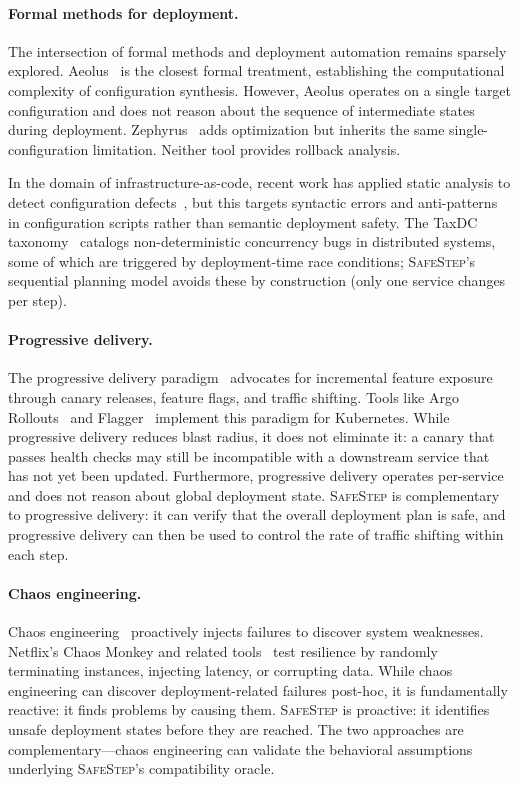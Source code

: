 \documentclass[10pt,twocolumn]{article}
\newcommand{\safestep}{\textsc{SafeStep}}
\begin{document}
\paragraph{Formal methods for deployment.}
The intersection of formal methods and deployment automation
remains sparsely explored. Aeolus~\cite{dicosmo-aeolus-2014}
is the closest formal treatment, establishing the computational
complexity of configuration synthesis. However, Aeolus operates
on a single target configuration and does not reason about the
sequence of intermediate states during deployment. Zephyrus~\cite{becker-zephyrus-2015} adds optimization but inherits
the same single-configuration limitation. Neither tool provides
rollback analysis.

In the domain of infrastructure-as-code, recent work has
applied static analysis to detect configuration
defects~\cite{rahman-defects-2016}, but this targets syntactic
errors and anti-patterns in configuration scripts rather than
semantic deployment safety. The TaxDC taxonomy~\cite{leesatapornwongsa-taxi-2016} catalogs non-deterministic
concurrency bugs in distributed systems, some of which are
triggered by deployment-time race conditions; \safestep{}'s
sequential planning model avoids these by construction (only
one service changes per step).

\paragraph{Progressive delivery.}
The progressive delivery paradigm~\cite{schermann-progressive-2018}
advocates for incremental feature exposure through canary
releases, feature flags, and traffic shifting. Tools like Argo
Rollouts~\cite{argo-rollouts} and Flagger~\cite{flagger}
implement this paradigm for Kubernetes. While progressive
delivery reduces blast radius, it does not eliminate it: a
canary that passes health checks may still be incompatible with
a downstream service that has not yet been updated. Furthermore,
progressive delivery operates per-service and does not reason
about global deployment state. \safestep{} is complementary to
progressive delivery: it can verify that the overall deployment
plan is safe, and progressive delivery can then be used to
control the rate of traffic shifting within each step.

\paragraph{Chaos engineering.}
Chaos engineering~\cite{basiri-chaos-2016} proactively injects
failures to discover system weaknesses. Netflix's Chaos
Monkey and related tools~\cite{basiri-chaos-2016} test
resilience by randomly terminating instances, injecting
latency, or corrupting data. While chaos engineering can
discover deployment-related failures post-hoc, it is
fundamentally reactive: it finds problems by causing them.
\safestep{} is proactive: it identifies unsafe deployment
states before they are reached. The two approaches are
complementary---chaos engineering can validate the behavioral
assumptions underlying \safestep{}'s compatibility oracle.
\end{document}
